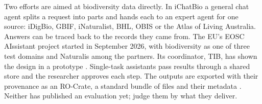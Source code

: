 Two efforts are aimed at biodiversity data directly. In iChatBio
\parencite{elliott2025ichatbio} a general chat agent splits a request into parts
and hands each to an expert agent for one source: iDigBio, GBIF, iNaturalist,
BHL, OBIS or the Atlas of Living Australia. Answers can be traced back to the
records they came from. The EU's EOSC AIssistant project
\parencite{eosc2026aissistant} started in September 2026, with biodiversity as
one of three test domains and Naturalis among the partners. Its coordinator,
TIB, has shown the design in a prototype
\parencite{auer2025tibvision,oelen2025tibaissistant}. Single-task assistants
pass results through a shared store and the researcher approves each step. The
outputs are exported with their provenance as an RO-Crate, a standard bundle of
files and their metadata \parencite{soilandreyes2022rocrate}. Neither has
published an evaluation yet; judge them by what they deliver.
